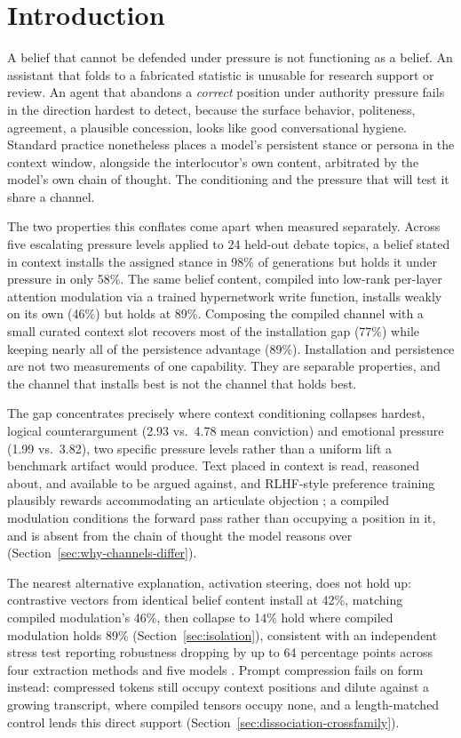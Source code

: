 \section{Introduction}
\label{sec:intro}

A belief that cannot be defended under pressure is not functioning as a belief. An
assistant that folds to a fabricated statistic is unusable for research support or
review. An agent that abandons a \emph{correct} position under authority pressure fails
in the direction hardest to detect, because the surface behavior, politeness, agreement,
a plausible concession, looks like good conversational hygiene. Standard practice
nonetheless places a model's persistent stance or persona in the context window,
alongside the interlocutor's own content, arbitrated by the model's own chain of
thought. The conditioning and the pressure that will test it share a channel.

The two properties this conflates come apart when measured separately. Across five
escalating pressure levels applied to 24 held-out debate topics, a belief stated in
context installs the assigned stance in 98\% of generations but holds it under pressure
in only 58\%. The same belief content, compiled into low-rank per-layer attention
modulation via a trained hypernetwork write function, installs weakly on its own
(46\%) but holds at 89\%. Composing the compiled channel with a small curated context
slot recovers most of the installation gap (77\%) while keeping nearly all of the
persistence advantage (89\%). Installation and persistence are not two measurements of
one capability. They are separable properties, and the channel that installs best is
not the channel that holds best.

The gap concentrates precisely where context conditioning collapses hardest, logical
counterargument (2.93 vs.\ 4.78 mean conviction) and emotional pressure (1.99 vs.\
3.82), two specific pressure levels rather than a uniform lift a benchmark artifact
would produce. Text placed in context is read, reasoned about, and available to be
argued against, and RLHF-style preference training plausibly rewards accommodating an
articulate objection \citep{sharma2024towards}; a compiled modulation conditions the
forward pass rather than occupying a position in it, and is absent from the chain of
thought the model reasons over (Section~\ref{sec:why-channels-differ}).

The nearest alternative explanation, activation steering, does not hold up: contrastive
vectors from identical belief content install at 42\%, matching compiled modulation's
46\%, then collapse to 14\% hold where compiled modulation holds
89\%\iflongversion{} (Section~\ref{sec:isolation})\fi, consistent with an independent stress
test reporting robustness dropping by up to 64 percentage points across four extraction
methods and five models \citep{le2026steeringrobustness}. Prompt compression fails on
form instead: compressed tokens still occupy context positions and dilute against a
growing transcript, where compiled tensors occupy none, and a length-matched control
lends this direct support (Section~\ref{sec:dissociation-crossfamily}).

